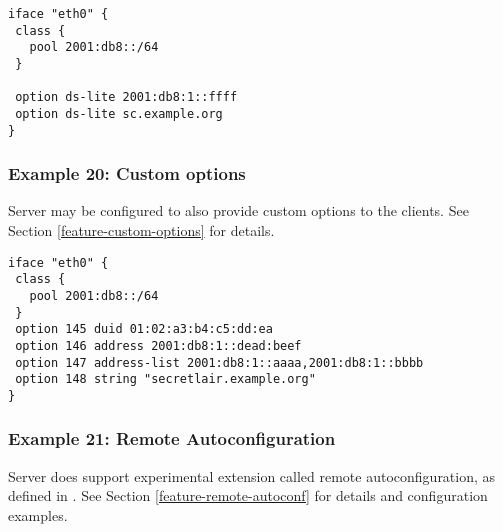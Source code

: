 \begin{lstlisting}
iface "eth0" {
 class {
   pool 2001:db8::/64
 }

 option ds-lite 2001:db8:1::ffff
 option ds-lite sc.example.org
}
\end{lstlisting}

\subsubsection{Example 20: Custom options}
\label{example-server-custom}
Server may be configured to also provide custom options to the
clients. See Section \ref{feature-custom-options} for details.

\begin{lstlisting}
iface "eth0" {
 class {
   pool 2001:db8::/64
 }
 option 145 duid 01:02:a3:b4:c5:dd:ea
 option 146 address 2001:db8:1::dead:beef
 option 147 address-list 2001:db8:1::aaaa,2001:db8:1::bbbb
 option 148 string "secretlair.example.org"
}
\end{lstlisting}


\subsubsection{Example 21: Remote Autoconfiguration}
Server does support experimental extension called remote
autoconfiguration, as defined in \cite{draft-remote-autoconf}. See
Section \ref{feature-remote-autoconf} for details and configuration
examples.

